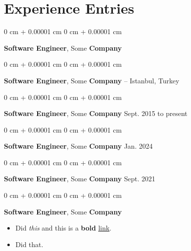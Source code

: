 \documentclass[10pt, letterpaper]{article}
\newenvironment{highlights}{
    \begin{itemize}[
        topsep=0.10 cm,
        parsep=0.10 cm,
        partopsep=0pt,
        itemsep=0pt,
        leftmargin=0 cm + 10pt
    ]
}{
    \end{itemize}
        
    \vspace{-0.20cm}
} %
\newenvironment{onecolentry}{
    \begin{adjustwidth}{
        0 cm + 0.00001 cm
    }{
        0 cm + 0.00001 cm
    }
}{
    \end{adjustwidth}
} %
\begin{document}
    
    \section{Experience Entries}

        
        \begin{onecolentry}
            \textbf{Software Engineer}, Some \textbf{Company} \hfill 
        \end{onecolentry}

        \vspace{0.1 cm}

        \begin{onecolentry}
            \textbf{Software Engineer}, Some \textbf{Company} -- Istanbul, Turkey \hfill 
        \end{onecolentry}

        \vspace{0.1 cm}

        \begin{onecolentry}
            \textbf{Software Engineer}, Some \textbf{Company} \hfill Sept. 2015 to present
        \end{onecolentry}

        \vspace{0.1 cm}

        \begin{onecolentry}
            \textbf{Software Engineer}, Some \textbf{Company} \hfill Jan. 2024
        \end{onecolentry}

        \vspace{0.1 cm}

        \begin{onecolentry}
            \textbf{Software Engineer}, Some \textbf{Company} \hfill Sept. 2021
        \end{onecolentry}

        \vspace{0.1 cm}

        \begin{onecolentry}
            \textbf{Software Engineer}, Some \textbf{Company} \hfill 
            \begin{highlights}
                \item Did \textit{this} and this is a \textbf{bold} \href{https://example.com}{link}.
                \item Did that.
            \end{highlights}
        \end{onecolentry}
\end{document}
